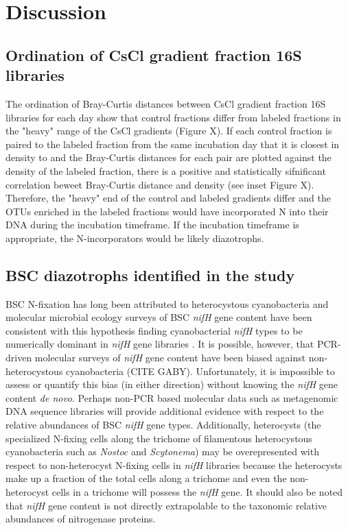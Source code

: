 \section{Discussion}

\subsection{Ordination of CsCl gradient fraction 16S libraries}
The ordination of Bray-Curtis distances between CsCl gradient fraction 16S libraries for each day show that control fractions differ from labeled fractions in the "heavy" range of the CsCl gradients (Figure X). If each control fraction is paired to the labeled fraction from the same incubation day that it is closest in density to and the Bray-Curtis distances for each pair are plotted against the density of the labeled fraction, there is a positive and statistically sifnificant correlation beweet Bray-Curtis distance and density (see inset Figure X). Therefore, the "heavy" end of the control and labeled gradients differ and the OTUs enriched in the labeled fractions would have incorporated N into their DNA during the incubation timeframe. If the incubation timeframe is appropriate, the N-incorporators would be likely diazotrophs.     

\subsection{BSC diazotrophs identified in the study}
BSC N-fixation has long been attributed to heterocystous cyanobacteria and molecular microbial ecology surveys of BSC \textit{nifH} gene content have been consistent with this hypothesis finding cyanobacterial \textit{nifH} types to be numerically dominant in \textit{nifH} gene libraries \cite{Yeager,14766579,Yeager_2012}. It is possible, however, that PCR-driven molecular surveys of \textit{nifH} gene content have been biased against non-heterocystous cyanobacteria (CITE GABY). Unfortunately, it is impossible to assess or quantify this bias (in either direction) without knowing the \textit{nifH} gene content \textit{de novo}. Perhaps non-PCR based molecular data such as metagenomic DNA sequence libraries will provide additional evidence with respect to the relative abundances of BSC \textit{nifH} gene types. Additionally, heterocysts (the specialized N-fixing cells along the trichome of filamentous heterocystous cyanobacteria such as \textit{Nostoc} and \textit{Scytonema}) may be overepresented with respect to non-heterocyst N-fixing cells in \textit{nifH} libraries because the heterocysts make up a fraction of the total cells along a trichome and even the non-heterocyst cells in a trichome will possess the \textit{nifH} gene. It should also be noted that \textit{nifH} gene content is not directly extrapolable to the taxonomic relative abundances of nitrogenase proteins.

